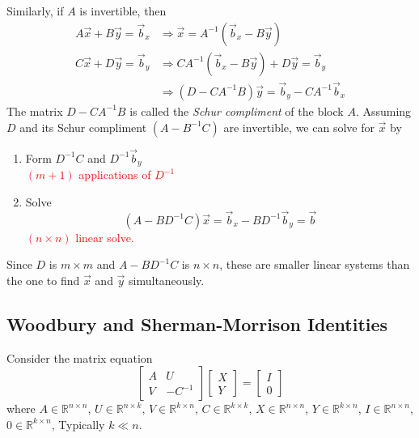 Similarly, if $A$ is invertible, then
\begin{align*}
  A\Vec{x} + B \Vec{y} = \Vec{b}_x &\Rightarrow \Vec{x} = A^{-1}(\Vec{b}_x - B \Vec{y} ) \\
  C\Vec{x} + D \Vec{y} = \Vec{b}_y &\Rightarrow CA^{-1}(\Vec{b}_x - B \Vec{y} ) + D \Vec{y} = \Vec{b}_y\\
  &\Rightarrow (D-CA^{-1}B)\Vec{y} = \Vec{b}_y - CA^{-1}\Vec{b}_x
\end{align*}
%
The matrix $D-CA^{-1}B$ is called the \emph{Schur compliment} of the block $A$.
%
%
Assuming $D$ and its Schur compliment $(A-B^{-1}C)$ are invertible, we can solve
for $\Vec{x}$ by
%
\begin{enumerate}[1)]
\item Form $D^{-1}C$ and $D^{-1}\Vec{b}_y$\\
  \textcolor{red}{$(m+1)$ applications of $D^{-1}$}
\item Solve
  \begin{equation*}
(A-BD^{-1}C)\Vec{x} = \Vec{b}_x - BD^{-1}\Vec{b}_y = \Vec{b}
  \end{equation*}
  \textcolor{red}{$(n \times n)$ linear solve.}
\end{enumerate}
%
Since $D$ is $m\times m$ and $A-BD^{-1}C$ is $n \times n$, these are smaller
linear systems than the one to find $\Vec{x}$ and $\Vec{y}$ simultaneously.

\subsection{Woodbury and Sherman-Morrison Identities}
Consider the matrix equation
%
\begin{equation*}
\begin{bmatrix}
  A & U \\
  V & -C^{-1}
\end{bmatrix}
\begin{bmatrix}
  X\\
  Y
\end{bmatrix}
=
\begin{bmatrix}
  I\\
  0
\end{bmatrix}
\end{equation*}
%
where
$A\in\mathbb{R}^{n \times n}$,
$U\in\mathbb{R}^{n \times k}$,
$V\in\mathbb{R}^{k \times n}$,
$C\in\mathbb{R}^{k \times k}$,
$X\in\mathbb{R}^{n \times n}$,
$Y\in\mathbb{R}^{k \times n}$,
$I\in\mathbb{R}^{n \times n}$,
$0\in\mathbb{R}^{k \times n}$,
%
Typically $k \ll n$.

